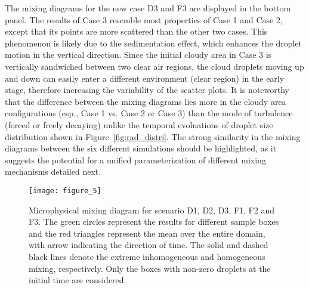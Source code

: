 \documentclass[draft,linenumbers]{agujournal}
\newcommand{\Fig}[1]{Figure~\ref{#1}}
\begin{document}
The mixing diagrams for {the new} case D3 and F3 are displayed in the bottom panel. {The results of} Case 3 resemble most properties of Case 1 and Case 2, except that its points are more scattered than the other two cases. This phenomenon is likely due to the sedimentation effect, which enhances the droplet motion in the vertical direction. Since the initial cloudy area in Case 3 is vertically sandwiched between two clear air regions, the cloud droplets moving up and down can easily enter a different environment (clear region) in the early stage, therefore increasing the variability of the scatter plots. {It is noteworthy that the difference between the mixing diagrams lies more in the cloudy area configurations (esp., Case 1 vs. Case 2 or Case 3) than the mode of turbulence (forced or freely decaying) unlike the temporal evoluations of droplet size distribution shown in \Fig{fig:rad_distri}.  The strong similarity in the mixing diagrams between the six different simulations should be highlighted, as it suggests the potential for a unified parameterization of different mixing mechanisms detailed next.}

\begin{figure}[!htbp]\centering
\texttt{[image: figure\_5]}
\caption{Microphysical mixing diagram for scenario D1, D2, D3, F1, F2 and F3. The green
circles represent the results for different sample boxes and the red triangles represent the mean over the entire domain, with arrow indicating the direction of time. The solid and dashed black lines denote the extreme inhomogeneous and homogeneous mixing, respectively. Only the boxes with non-zero droplets at the initial time are considered.}
\label{fig:mixing_diagram}
\end{figure}
\end{document}
